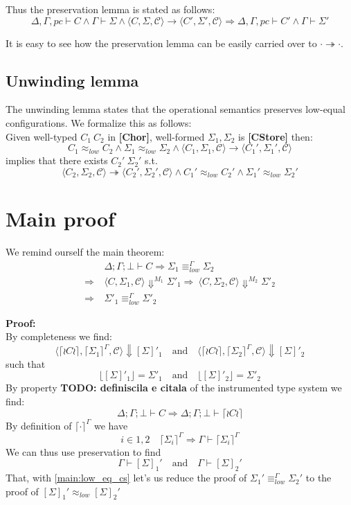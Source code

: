 \documentclass[12pt,a4paper,twoside]{book}
\begin{document}
Thus the preservation lemma is stated as follows:
$$
\Delta, \Gamma, pc \vdash C \land \Gamma \vdash \Sigma \land 
\langle C, \Sigma, \mathscr{C}\rangle \rightarrow
\langle C', \Sigma', \mathscr{C}\rangle \Rightarrow 
\Delta, \Gamma, pc \vdash C' \land \Gamma \vdash \Sigma'
$$

It is easy to see how the preservation lemma can be easily carried over to $\cdot \twoheadrightarrow \cdot$.

\subsection{Unwinding lemma}
The unwinding lemma states that the operational semantics preserves low-equal configurations. We formalize this as follows:\\
Given well-typed $C_1~C_2$ in \textbf{[Chor]}, well-formed $\Sigma_1, \Sigma_2$ is \textbf{[CStore]} then:
$$
C_1 \approx_{low} C_2 \land
\Sigma_1 \approx_{low} \Sigma_2 \land
\langle C_1, \Sigma_1, \mathscr{C} \rangle \rightarrow
\langle C_1', \Sigma_1', \mathscr{C} \rangle
$$
implies that there exists $C_2'~\Sigma_2'$ s.t.
$$
\langle C_2, \Sigma_2, \mathscr{C} \rangle \twoheadrightarrow
\langle C_2', \Sigma_2', \mathscr{C} \rangle
\land C_1' \approx_{low} C_2'
\land \Sigma_1' \approx_{low} \Sigma_2'
$$

\section{Main proof}
We remind ourself the main theorem:
\begin{align*}
	&\Delta;\Gamma;\bot \vdash C \Rightarrow
	\Sigma_1 \equiv^\Gamma_{low} \Sigma_2 \\ \Rightarrow\ &\langle C, \Sigma_1, \mathscr{C}\rangle \Downarrow^{M_1} \Sigma'_1
	\Rightarrow\ \langle C, \Sigma_2, \mathscr{C}\rangle \Downarrow^{M_2} \Sigma'_2 \\ \Rightarrow\ &\Sigma'_1 \equiv^\Gamma_{low} \Sigma'_2
\end{align*}

\noindent\textbf{Proof:}\\
By completeness we find:
$$
	\langle \lceil \wr C \wr \rceil, \lceil \Sigma_1 \rceil^\Gamma, \mathscr{C}\rangle \Downarrow [\Sigma]'_1 \quad \text{and} \quad
	\langle \lceil \wr C \wr \rceil, \lceil \Sigma_2 \rceil^\Gamma, \mathscr{C}\rangle \Downarrow [\Sigma]'_2
$$
such that
\begin{equation}\label{main:low_eq_cs}
\lfloor [\Sigma]'_1 \rfloor = \Sigma'_1 \quad \text{and} \quad
\lfloor [\Sigma]'_2 \rfloor = \Sigma'_2
\end{equation}
By property \textbf{TODO: definiscila e citala} of the instrumented type system we find:
$$\Delta;\Gamma;\bot \vdash C \Rightarrow
\Delta;\Gamma;\bot \vdash \lceil \wr C \wr \rceil$$
By definition of $\lceil \cdot \rceil^\Gamma$ we have
$$
i \in {1,2} \quad \lceil \Sigma_i \rceil^\Gamma \Rightarrow
\Gamma \vdash \lceil \Sigma_i \rceil^\Gamma
$$
We can thus use preservation to find
$$
\Gamma \vdash [\Sigma]_1' \quad \text{and} \quad \Gamma \vdash [\Sigma]_2'
$$
That, with \ref{main:low_eq_cs} let's us reduce the proof of $
\Sigma_1' \equiv_{low}^\Gamma \Sigma_2'$ to the proof of
$ [\Sigma]_1' \approx_{low} [\Sigma]_2' $
\end{document}
